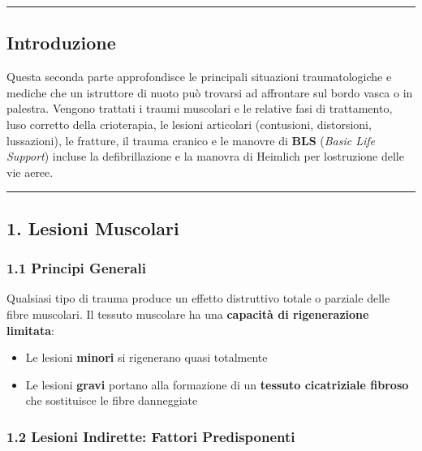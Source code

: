 \documentclass[a4paper,11pt]{article}
\providecommand{\tightlist}{%
  \setlength{\itemsep}{0pt}\setlength{\parskip}{0pt}}
\begin{document}
\begin{center}\rule{0.5\linewidth}{0.5pt}\end{center}

\subsection{Introduzione}\label{introduzione-8}

Questa seconda parte approfondisce le principali situazioni
traumatologiche e mediche che un istruttore di nuoto può trovarsi ad
affrontare sul bordo vasca o in palestra. Vengono trattati i traumi
muscolari e le relative fasi di trattamento, l\textquotesingle uso
corretto della crioterapia, le lesioni articolari (contusioni,
distorsioni, lussazioni), le fratture, il trauma cranico e le manovre di
\textbf{BLS} (\emph{Basic Life Support}) incluse la defibrillazione e la
manovra di Heimlich per l\textquotesingle ostruzione delle vie aeree.

\begin{center}\rule{0.5\linewidth}{0.5pt}\end{center}

\subsection{1. Lesioni Muscolari}\label{lesioni-muscolari}

\subsubsection{1.1 Principi Generali}\label{principi-generali}

Qualsiasi tipo di trauma produce un effetto distruttivo totale o
parziale delle fibre muscolari. Il tessuto muscolare ha una
\textbf{capacità di rigenerazione limitata}:

\begin{itemize}
      \tightlist
      \item
            Le lesioni \textbf{minori} si rigenerano quasi totalmente
      \item
            Le lesioni \textbf{gravi} portano alla formazione di un
            \textbf{tessuto cicatriziale fibroso} che sostituisce le fibre
            danneggiate
\end{itemize}

\subsubsection{1.2 Lesioni Indirette: Fattori
      Predisponenti}\label{lesioni-indirette-fattori-predisponenti}
\end{document}
